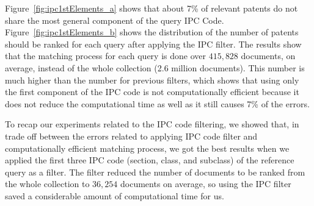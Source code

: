 Figure~\ref{fig:ipc1stElements_a} shows that about 7\% of relevant patents do not share the most general component of the query IPC Code. 
Figure~\ref{fig:ipc1stElements_b} shows the distribution of the number of patents should be ranked for each query after applying the IPC filter.
The results show that the matching process for each query is done over $ 415,828 $ documents, on average, instead of the whole collection (2.6 million documents). This number is much higher than the number for previous filters, which shows that using only the first component of the IPC code is not computationally efficient because it does not reduce the computational time as well as it still causes 7\% of the errors. 

To recap our experiments related to the IPC code filtering, we showed that, in trade off between the errors related to applying IPC code filter and computationally efficient matching process, we got the best results when we applied the first three IPC code (section, class, and subclass) of the reference query as a filter. The filter reduced the number of documents to be ranked from the whole collection to $ 36,254 $ documents on average, so using the IPC filter saved a considerable amount of computational time for us.\\\\